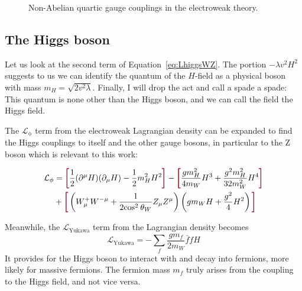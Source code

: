 \begin{figure}[!hbt]
 \caption{Non-Abelian quartic gauge couplings in the electroweak theory.} \label{fig:4GC}
\end{figure}

\subsection{The Higgs boson}

Let us look at the second term of Equation~\ref{eq:LhiggsWZ}.
The portion $-\lambda v^2 H^2 $ suggests to us we can identify the quantum of the $H$-field as a physical boson with mass $m_H = \sqrt{2v^2\lambda}$.
Finally, I will drop the act and call a spade a spade:
This quantum is none other than the Higgs boson, and we can call the field the Higgs field.

The $\mathcal{L}_\mathrm{\phi}$ term from the electroweak Lagrangian density can be expanded to find the Higgs couplings to itself and the other gauge bosons, in particular to the Z boson which is relevant to this work:

\begin{equation}
\begin{split}
\label{eq:L_phi}
\mathcal{L}_\mathrm{\phi} & = \termLB \frac{1}{2} (\partial^\mu H) (\partial_\mu H) - \frac{1}{2}m_H^2 H^2 \termRB - \termLB \frac{gm_H^2}{4m_W} H^3 + \frac{g^2m_H^2}{32m_W^2}H^4 \termRB \\
& + \termLB \left( W_\mu^+ W^{{-}\mu} + \frac{1}{2\mathrm{cos}^2\:\theta_W} Z_\mu Z^\mu \right) \left( gm_WH+\frac{g^2}{4}H^2 \right) \termRB
\end{split}
\end{equation}

Meanwhile, the $\mathcal{L}_\mathrm{Yukawa}$ term from the Lagrangian density becomes
\begin{equation}
\label{L_Yukawa}
\mathcal{L}_\mathrm{Yukawa} = {-} \sum_f \frac{gm_f}{2m_W} \bar{f}fH
\end{equation}
It provides for the Higgs boson to interact with and decay into fermions,
more likely for massive fermions.
The fermion mass $m_f$ truly arises from the coupling to the Higgs field, and not vice versa.

